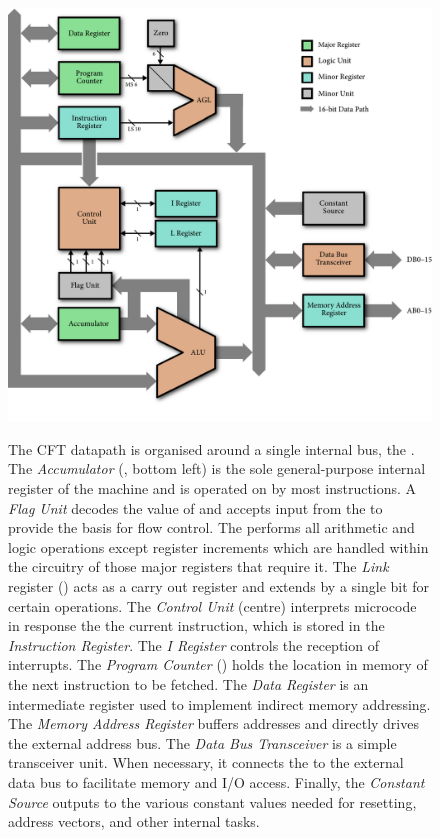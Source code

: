 \begin{figure}
\includegraphics[width=\textwidth]{figs/datapath2.pdf}\vspace{2em}\\
\caption[Datapath]{\label{fig-datapath} The CFT datapath is organised around a
  single internal bus, the \IBUS. The {\em \gls{Accumulator}\/} (\A, bottom
  left) is the sole general-purpose internal register of the machine
  and is operated on by most instructions. A {\em Flag Unit\/} decodes
  the value of \A{} and accepts input from the \ALU{} to provide the
  basis for flow control. The \ALU{} performs all arithmetic and logic
  operations except register increments which are handled within the
  circuitry of those major registers that require it. The {\em Link\/}
  register (\Lreg) acts as a carry out register and extends \A{} by a
  single bit for certain operations. The {\em Control Unit\/} (centre)
  interprets microcode in response the the current instruction, which
  is stored in the {\em Instruction Register\/}. The {\em I Register}
  controls the reception of interrupts. The {\em Program Counter\/}
  (\PC) holds the location in memory of the next instruction to be
  fetched. The {\em Data Register\/} is an intermediate register used
  to implement indirect memory addressing. The {\em Memory Address
    Register\/} buffers addresses and directly drives the external
  address bus. The {\em Data Bus Transceiver\/} is a simple
  transceiver unit. When necessary, it connects the \IBUS{} to the
  external data bus to facilitate memory and I/O access. Finally, the
  {\em Constant Source\/} outputs to the \IBUS{} various constant
  values needed for resetting, address vectors, and other internal
  tasks.  }
\end{figure}

